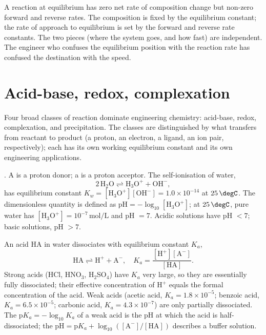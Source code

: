 \begin{principle}
A reaction at equilibrium has zero net rate of composition change but
non-zero forward and reverse rates. The composition is fixed by the
equilibrium constant; the rate of approach to equilibrium is set by
the forward and reverse rate constants. The two pieces (where the
system goes, and how fast) are independent. The engineer who confuses
the equilibrium position with the reaction rate has confused the
destination with the speed.
\end{principle}

\section{Acid-base, redox, complexation}

Four broad classes of reaction dominate engineering chemistry:
acid-base, redox, complexation, and precipitation. The classes are
distinguished by what transfers from reactant to product (a proton, an
electron, a ligand, an ion pair, respectively); each has its own
working equilibrium constant and its own engineering applications.

. A  is a proton
donor; a  is a proton acceptor. The
self-ionisation of water,
\[
2\,\text{H}_2\text{O} \rightleftharpoons \text{H}_3\text{O}^+ +
\text{OH}^-,
\]
has equilibrium constant $K_w = [\text{H}_3\text{O}^+][\text{OH}^-] =
1.0 \times 10^{-14}$ at $25\,\degC$. The dimensionless quantity
 is defined as $\text{pH} = -\log_{10}[\text{H}_3\text{O}^+]$;
at $25\,\degC$, pure water has $[\text{H}_3\text{O}^+] = 10^{-7}\,
\text{mol}/\text{L}$ and pH $= 7$. Acidic solutions have pH $< 7$;
basic solutions, pH $> 7$.

An acid HA in water dissociates with equilibrium constant $K_a$,
\[
\text{HA} \rightleftharpoons \text{H}^+ + \text{A}^-, \quad K_a =
\frac{[\text{H}^+][\text{A}^-]}{[\text{HA}]}.
\]
Strong acids (HCl, HNO$_3$, H$_2$SO$_4$) have $K_a$ very large, so
they are essentially fully dissociated; their effective concentration
of $\text{H}^+$ equals the formal concentration of the acid. Weak
acids (acetic acid, $K_a = 1.8 \times 10^{-5}$; benzoic acid, $K_a =
6.5 \times 10^{-5}$; carbonic acid, $K_a = 4.3 \times 10^{-7}$) are
only partially dissociated. The $\text{p}K_a = -\log_{10} K_a$ of a
weak acid is the pH at which the acid is half-dissociated; the
 $\text{pH} = \text{p}K_a +
\log_{10}([\text{A}^-]/[\text{HA}])$ describes a buffer solution.

